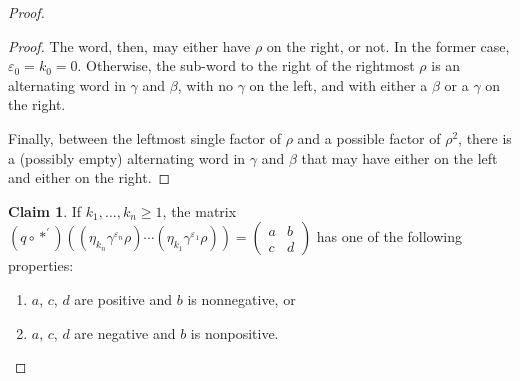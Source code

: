 \documentclass{amsart}     %
\theoremstyle{definition}
\newtheorem{claim}[thm]{Claim}
\begin{document}
\begin{proof}
\begin{description}
\begin{proof}
The word, then, may either have $\rho$ on the right, or not. In the former case, $\varepsilon_0 = k_0 = 0$. Otherwise, the sub-word to the right of the rightmost $\rho$ is an alternating word in $\gamma$ and $\beta$, with no $\gamma$ on the left, and with either a $\beta$ or a $\gamma$ on the right.

Finally, between the leftmost single factor of $\rho$ and a possible factor of $\rho^2$, there is a (possibly empty) alternating word in $\gamma$ and $\beta$ that may have either on the left and either on the right.
\end{proof}

\begin{claim}
\label{claim:allnonnegallnonpos}
If $k_1, \dots, k_{n} \geq 1$, the matrix $\left( q \circ *^{'} \right) \left( \left( \eta_{k_{n}}\gamma^{\varepsilon_{n}}\rho \right) \cdots \left( \eta_{k_1}\gamma^{\varepsilon_1}\rho \right) \right) = \begin{pmatrix} a & b \\ c & d \end{pmatrix}$ has one of the following properties:
\begin{enumerate}
\item $a$, $c$, $d$ are positive and $b$ is nonnegative, or
\item $a$, $c$, $d$ are negative and $b$ is nonpositive.
\end{enumerate} 
\end{claim}


\end{description}
\end{proof}
\end{document}
